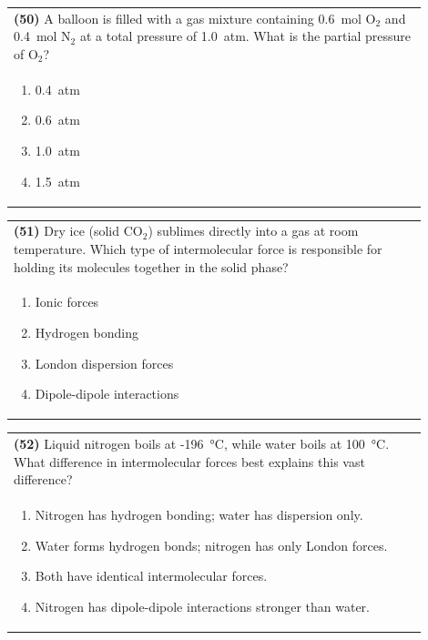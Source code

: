 \documentclass{article}
\begin{document}
\noindent\begin{tabular}{|p{0.9\linewidth}|}
\hline
\textbf{(50)} A balloon is filled with a gas mixture containing 0.6~mol O$_2$ and 0.4~mol N$_2$ at a total pressure of 1.0~atm. What is the partial pressure of O$_2$?\\[0.2cm]
\begin{minipage}[t]{0.85\linewidth}
\begin{enumerate}[label=\alph*.]
\item 0.4~atm
\item 0.6~atm
\item 1.0~atm
\item 1.5~atm
\end{enumerate}
\end{minipage}\\[0.2cm]
\hline
\end{tabular}

\vspace{0.2cm}
\noindent\begin{tabular}{|p{0.9\linewidth}|}
\hline
\textbf{(51)} Dry ice (solid CO$_2$) sublimes directly into a gas at room temperature. Which type of intermolecular force is responsible for holding its molecules together in the solid phase?\\[0.2cm]
\begin{minipage}[t]{0.85\linewidth}
\begin{enumerate}[label=\alph*.]
\item Ionic forces
\item Hydrogen bonding
\item London dispersion forces
\item Dipole-dipole interactions
\end{enumerate}
\end{minipage}\\[0.2cm]
\hline
\end{tabular}

\noindent\begin{tabular}{|p{0.9\linewidth}|}
\hline
\textbf{(52)} Liquid nitrogen boils at -196~°C, while water boils at 100~°C. What difference in intermolecular forces best explains this vast difference?\\[0.2cm]
\begin{minipage}[t]{0.85\linewidth}
\begin{enumerate}[label=\alph*.]
\item Nitrogen has hydrogen bonding; water has dispersion only.
\item Water forms hydrogen bonds; nitrogen has only London forces.
\item Both have identical intermolecular forces.
\item Nitrogen has dipole-dipole interactions stronger than water. 
\end{enumerate}
\end{minipage}\\[0.2cm]
\hline
\end{tabular}
\newpage
\end{document}

